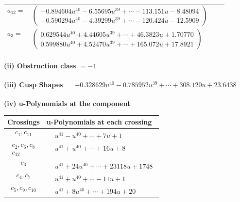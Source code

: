 \documentclass[1p]{elsarticle_modified}
\theoremstyle{definition}
\begin{document}
\begin{tabular}{m{7pt} m{180pt} m{7pt} m{180pt} }
\flushright $a_{12}=$&$\begin{pmatrix}-0.894604 u^{40}-6.55695 u^{39}+\cdots-113.151 u-8.48094\\-0.590294 u^{40}-4.39299 u^{39}+\cdots-120.424 u-12.5909\end{pmatrix}$ \\
\flushright $a_{3}=$&$\begin{pmatrix}0.629544 u^{40}+4.44605 u^{39}+\cdots+46.3823 u+1.70770\\0.599880 u^{40}+4.52470 u^{39}+\cdots+165.072 u+17.8921\end{pmatrix}$\\&\end{tabular}
\flushleft \textbf{(ii) Obstruction class $= -1$}\\~\\
\flushleft \textbf{(iii) Cusp Shapes $= -0.328629 u^{40}-0.785952 u^{39}+\cdots+308.120 u+23.6438$}\\~\\
\newpage\renewcommand{\arraystretch}{1}
\flushleft \textbf{(iv) u-Polynomials at the component}\newline \\
\begin{tabular}{m{50pt}|m{274pt}}
Crossings & \hspace{64pt}u-Polynomials at each crossing \\
\hline $$\begin{aligned}c_{1},c_{11}\end{aligned}$$&$\begin{aligned}
&u^{41}- u^{40}+\cdots+7 u+1
\end{aligned}$\\
\hline $$\begin{aligned}c_{2},c_{6},c_{8}\\c_{12}\end{aligned}$$&$\begin{aligned}
&u^{41}+u^{40}+\cdots+16 u+8
\end{aligned}$\\
\hline $$\begin{aligned}c_{3}\end{aligned}$$&$\begin{aligned}
&u^{41}+24 u^{40}+\cdots+23118 u+1748
\end{aligned}$\\
\hline $$\begin{aligned}c_{4},c_{7}\end{aligned}$$&$\begin{aligned}
&u^{41}+u^{40}+\cdots-11 u+1
\end{aligned}$\\
\hline $$\begin{aligned}c_{5},c_{9},c_{10}\end{aligned}$$&$\begin{aligned}
&u^{41}+8 u^{40}+\cdots+194 u+20
\end{aligned}$\\
\hline
\end{tabular}\\~\\
\end{document}
